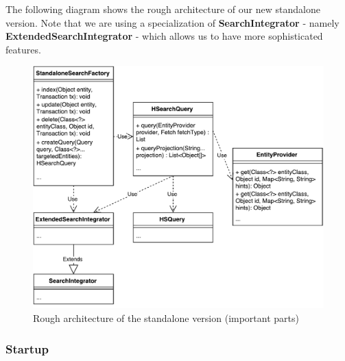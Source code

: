 \noindent
The following diagram shows the rough architecture of our new standalone version. Note that we are using a specialization of \textbf{SearchIntegrator} - namely \textbf{ExtendedSearchIntegrator} - which allows us to have more sophisticated features.
\\
\begin{figure}[ht]
	\centering
	\includegraphics[scale=0.6]{images/standalone_min_architecture.pdf}
	\caption{Rough architecture of the standalone version (important parts)}
	\label{standalone_min_architecture}
\end{figure}

\pagebreak

\subsubsection{Startup}

